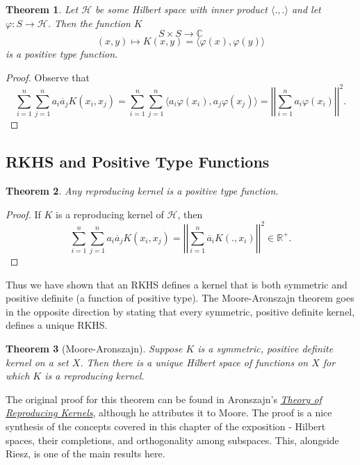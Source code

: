 \documentclass[psamsfonts]{amsart}
\newtheorem{thm}{Theorem}[section]
\theoremstyle{definition}
\theoremstyle{remark}
\numberwithin{equation}{section}
\begin{document}
\begin{thm}
Let $\mathcal{H}$ be some Hilbert space with inner product $\langle . , . \rangle$ and let $\varphi : S \rightarrow \mathcal{H}$. Then the function $K$ 
$$S \times S \rightarrow \mathbb{C} $$
$$(x,y) \mapsto K(x,y) = \langle \varphi (x), \varphi (y) \rangle $$
is a positive type function. 
\end{thm}

\begin{proof}
Observe that 
$$\sum _{i= 1} ^n \sum _{j = 1} ^n a_i \overline{a}_j K(x_i, x_j)  = \sum _{i= 1} ^n \sum _{j = 1} ^n \langle a_i \varphi (x_i), a_j \varphi (x_j) \rangle = \left| \left| \sum _{i = 1} ^n a_i \varphi (x_i) \right| \right|^2.  $$
\end{proof}

\subsection{RKHS and Positive Type Functions}

\begin{thm}
Any reproducing kernel is a positive type function.
\end{thm}
\begin{proof}
If $K$ is a reproducing kernel of $\mathcal{H}$, then 
$$\sum _{i= 1} ^n \sum _{j = 1} ^n a_i \overline{a}_j K(x_i, x_j) = \left| \left| \sum _{i = 1} ^n \overline{a}_i K(., x_i) \right| \right|^2 \in \mathbb{R}^+. $$
\end{proof}

Thus we have shown that an RKHS defines a kernel that is both symmetric and positive definite (a function of positive type). The Moore-Aronszajn theorem goes in the opposite direction by stating that every symmetric, positive definite kernel, defines a unique RKHS. 

\begin{thm}[Moore-Aronszajn]
Suppose $K$ is a symmetric, positive definite kernel on a set $X$. Then there is a unique Hilbert space of functions on $X$ for which $K$ is a reproducing kernel. 
\end{thm}

The original proof for this theorem can be found in Aronszajn's \href{https://www.ams.org/journals/tran/1950-068-03/S0002-9947-1950-0051437-7/S0002-9947-1950-0051437-7.pdf}{\textit{Theory of Reproducing Kernels}}, although he attributes it to Moore. The proof is a nice synthesis of the concepts covered in this chapter of the exposition - Hilbert spaces, their completions, and orthogonality among subspaces. This, alongside Riesz, is one of the main results here. 
\end{document}
